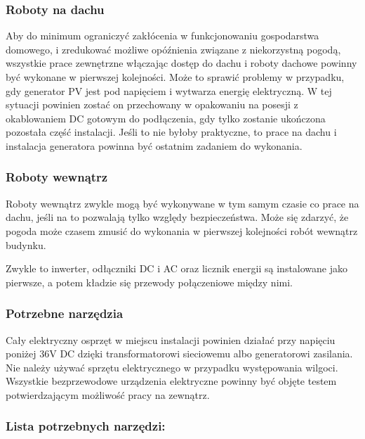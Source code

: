 \documentclass[12pt,a4paper]{article}
\begin{document}
\subsubsection{Roboty na dachu}
Aby do minimum ograniczyć zakłócenia w 
funkcjonowaniu gospodarstwa domowego, i zredukować możliwe opóźnienia 
związane z niekorzystną pogodą, wszystkie prace zewnętrzne włączając 
dostęp do dachu i roboty dachowe powinny być wykonane w pierwszej 
kolejności. Może to sprawić problemy w przypadku, gdy generator PV jest 
pod napięciem i wytwarza energię elektryczną. W tej sytuacji powinien 
zostać on przechowany w opakowaniu na posesji z okablowaniem DC gotowym 
do podłączenia, gdy tylko zostanie ukończona pozostała część instalacji. 
Jeśli to nie byłoby praktyczne, to prace na dachu i instalacja 
generatora powinna być ostatnim zadaniem do wykonania. 

 

\subsubsection{Roboty wewnątrz }
Roboty wewnątrz zwykle mogą być wykonywane w tym samym czasie co prace 
na dachu, jeśli na to pozwalają tylko względy bezpieczeństwa. Może się 
zdarzyć, że pogoda może czasem zmusić do wykonania w pierwszej 
kolejności robót wewnątrz budynku. 

Zwykle to inwerter, odłączniki DC i AC oraz licznik energii są 
instalowane jako pierwsze, a potem kładzie się przewody połączeniowe 
między nimi. 

 

\subsubsection{Potrzebne narzędzia}

Cały elektryczny osprzęt w miejscu instalacji powinien działać przy 
napięciu poniżej 36V DC dzięki transformatorowi sieciowemu albo 
generatorowi zasilania. Nie należy używać sprzętu elektrycznego w 
przypadku występowania wilgoci. Wszystkie bezprzewodowe urządzenia 
elektryczne powinny być objęte testem potwierdzającym możliwość pracy na 
zewnątrz. 

 

\subsubsection{Lista potrzebnych narzędzi:}
\end{document}

